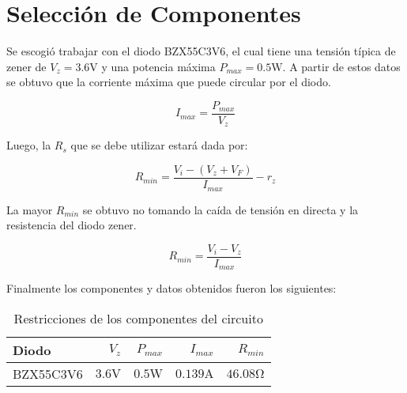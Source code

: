 \begin{figure}[ht]
    \begin{center}
        
        \label{fig:limitador_activado}
    \end{center}
\end{figure}

\section{Selección de Componentes}

Se escogió trabajar con el diodo BZX55C3V6, el cual tiene una tensión típica de zener de $V_z = 3.6 \si{\volt}$ y una potencia máxima $P_{max} = 0.5 \si{\watt}$. A partir de estos datos se obtuvo que la corriente máxima que puede circular por el diodo.

\begin{equation}
    I_{max}=\frac{P_{max}}{V_z}
\end{equation}

Luego, la $R_s$ que se debe utilizar estará dada por:

\begin{equation}
    R_{min}=\frac{V_i-(V_z+V_F)}{I_{max}}-r_z
\end{equation}

La mayor $R_{min}$ se obtuvo no tomando la caída de tensión en directa y la resistencia del diodo zener.

\begin{equation}
    R_{min}=\frac{V_i-V_z}{I_{max}}
\end{equation}

Finalmente los componentes y datos obtenidos fueron los siguientes:

\begin{table}[ht]
    \begin{center}
        \begin{tabular}{|l|r|r|r|r|}
            \hline
            Diodo & $V_z$ & $P_{max}$ & $I_{max}$ & $R_{min}$ \\
            \hline
            BZX55C3V6 & $3.6 \si{\volt}$ & $0.5 \si{\watt}$ & $0.139 \si{\ampere}$ & $46.08 \si{\ohm}$ \\
            \hline
        \end{tabular}
        \caption{Restricciones de los componentes del circuito}
        \label{tabla_limitador}
    \end{center}
\end{table}

